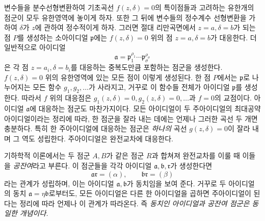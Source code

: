 변수들을 분수선형변환하여 기초곡선 \(f(z,\delta)=0\)의 특이점들과 고려하는 유한개의 점군이 모두 유한영역에 놓이게 하자. 또한 그 뒤에 변수들의 정수계수 선형변환을 가하여 \(\delta\)가 \(z\)에 관하여 정수적이게 하자. 그러면 절대 리만곡면에서 \(z=a,\delta=b\)가 되는 점 \(P\)를 생성하는 소아이디얼 \(\mathfrak p\)에는 \(f(z,\delta)=0\) 위의 점 \(z=a,\delta=b\)가 대응한다. 더 일반적으로 아이디얼
\[
\mathfrak a=\mathfrak p_1^{\rho_1}\cdots\mathfrak p_\sigma^{\rho_\sigma}
\]
은 각 점 \(z=a_i,\delta=b_i\)를 대응하는 중복도만큼 포함하는 점군을 생성한다. \(f(z,\delta)=0\) 위의 유한영역에 있는 모든 점이 이렇게 생성된다. 한 점 \(P\)에서는 \(\mathfrak p\)로 나누어지는 모든 함수 \(g_1,g_2,\ldots\)가 사라지고, 거꾸로 이 함수들 전체가 아이디얼 \(\mathfrak p\)를 생성한다. 따라서 \(f\) 위의 대응점은 \(g_1(z,\delta)=0,g_2(z,\delta)=0,\ldots\)과 \(f=0\)의 교점이다. 아이디얼 \(\mathfrak a\)에 대응하는 점군도 마찬가지이다. 모든 아이디얼이 두 주아이디얼의 최대공약아이디얼이라는 정리에 따라, 한 점군을 잘라 내는 데에는 언제나 그러한 곡선 두 개면 충분하다. 특히 한 주아이디얼에 대응하는 점군은 \emph{하나의} 곡선 \(g(z,\delta)=0\)이 잘라 내며 그 역도 성립한다. 주아이디얼은 완전교차에 대응한다.

기하학적 이론에서는 두 점군 \(A,B\)가 같은 점군 \(R\)과 합쳐져 완전교차를 이룰 때 이들을 \emph{공잔여}라고 부른다. 이 점군들을 각각 아이디얼 \(\mathfrak a,\mathfrak b,\mathfrak r\)가 생성한다면
\[
\mathfrak a\mathfrak r=(\alpha),\qquad
\mathfrak b\mathfrak r=(\beta)
\]
라는 관계가 성립하며, 이는 아이디얼 \(\mathfrak a,\mathfrak b\)가 동치임을 보여 준다. 거꾸로 두 아이디얼의 동치 \(\mathfrak a=\eta\mathfrak b\)로부터도, 모든 아이디얼은 다른 한 아이디얼을 곱하면 주아이디얼이 된다는 정리에 따라 언제나 이 관계가 따라온다. 즉 \emph{동치인 아이디얼과 공잔여 점군은 동일한 개념이다.}


